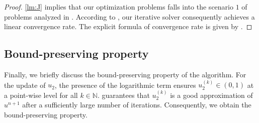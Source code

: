 \begin{proof}
    \ref{lm:J} implies that our optimization problems falls into the scenario $1$ of problems analyzed in \cite{deng2016global}. 
According to \cite[Theorem 3.4]{deng2016global}, our iterative solver  consequently achieves a linear convergence rate. 
The explicit formula of convergence rate is given by \cite[Corollary 3.6]{deng2016global}.
\end{proof}

\subsection{Bound-preserving property}
Finally, we briefly discuss the bound-preserving property of the algorithm. 
For the update of $u_2$, the presence of the logarithmic term ensures $u_2^{(k)}\in(0,1)$ at a point-wise level for all $k \in \mathbb{N}$. 
 guarantees that $u_2^{(k)}$ is a good approximation of $u^{n+1}$ after a sufficiently large number of iterations. 
Consequently, we obtain the bound-preserving property.




